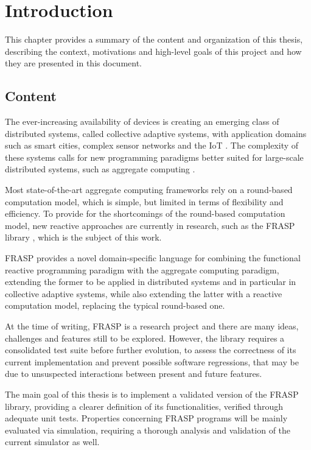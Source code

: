 
\chapter{Introduction}
\label{chapter:introduction}

This chapter provides a summary of the content and organization of this thesis,
describing the context, motivations and high-level goals of this project and
how they are presented in this document.

\section{Content}

The ever-increasing availability of devices is creating an emerging class of
distributed systems, called collective adaptive systems, with application
domains such as smart cities, complex sensor networks and the \ac{IoT}
\cite{CAS-AggregateComputingBlocks}. The complexity of these systems calls for
new programming paradigms better suited for large-scale distributed systems,
such as aggregate computing \cite{FieldCalculus-AggregateComputing}.

Most state-of-the-art aggregate computing frameworks rely on a round-based
computation model, which is simple, but limited in terms of flexibility and
efficiency. To provide for the shortcomings of the round-based computation
model, new reactive approaches are currently in research, such as the FRASP
library \cite{FRASP}, which is the subject of this work.

FRASP provides a novel domain-specific language for combining the functional
reactive programming paradigm with the aggregate computing paradigm, extending
the former to be applied in distributed systems and in particular in collective
adaptive systems, while also extending the latter with a reactive computation
model, replacing the typical round-based one.

At the time of writing, FRASP is a research project and there are many ideas,
challenges and features still to be explored. However, the library requires a
consolidated test suite before further evolution, to assess the correctness of
its current implementation and prevent possible software regressions, that may
be due to unsuspected interactions between present and future features.

The main goal of this thesis is to implement a validated version of the FRASP
library, providing a clearer definition of its functionalities, verified
through adequate unit tests. Properties concerning FRASP programs will be
mainly evaluated via simulation, requiring a thorough analysis and validation
of the current simulator as well.

